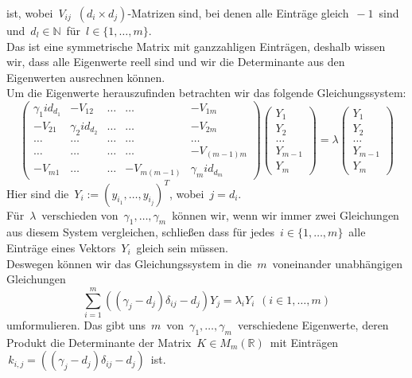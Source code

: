 ist, wobei $\,V_{ij}\,$ $(d_i\times d_j)$-Matrizen sind, bei denen alle Einträge gleich $\,-1\,$ sind und $\,d_l\in\mathbb{N}\,$ für $\,l\in \{1,\ldots,m\}$.\;\\
Das ist eine symmetrische Matrix mit ganzzahligen Einträgen, deshalb wissen wir, dass alle Eigenwerte reell sind und wir die Determinante aus den Eigenwerten ausrechnen können.\\
Um die Eigenwerte herauszufinden betrachten wir das folgende Gleichungssystem:
\begin{equation}
\begin{pmatrix}
 {\gamma_1}id_{d_1}&-V_{12}&\ldots&\ldots&-V_{1m}\\
 -V_{21}&{\gamma_2}id_{d_2}&\ldots&\ldots&-V_{2m}\\
 \ldots&\ldots&\ldots&\ldots&\ldots\\
  \ldots&\ldots&\ldots&\ldots&-V_{(m-1)m}\\
 -V_{m1}&\ldots&\ldots&-V_{m(m-1)}&{\gamma_m}id_{d_m}
\end{pmatrix}
\begin{pmatrix}
 Y_1\\
 Y_2\\
 \ldots\\
 Y_{m-1}\\
 Y_m
\end{pmatrix}
 =\lambda
 \begin{pmatrix}
 Y_1\\
 Y_2\\
 \ldots\\
 Y_{m-1}\\
 Y_m
\end{pmatrix}
\end{equation}
Hier sind die $\,Y_i:=(y_{i_1},\ldots,y_{i_j})^T$,\; wobei $\,j=d_i$.\; \\
Für $\,\lambda\,$ verschieden von $\,\gamma_1,\ldots,\gamma_m\,$ können wir, wenn wir immer zwei Gleichungen aus diesem System vergleichen, schließen dass für jedes $\,i \in \{1,\ldots,m\}\,$ alle Einträge eines Vektors $\,Y_i\,$ gleich sein müssen.\\
Deswegen können wir das Gleichungssystem in die $\,m\,$ voneinander unabhängigen Gleichungen 
\begin{equation}
 \sum_{i=1}^m((\gamma_j-d_j)\delta_{ij}-d_j)Y_j=\lambda_iY_i
  \hspace{5pt}(i\in{1,\ldots,m})
\end{equation}
umformulieren.
Das gibt uns $\,m\,$  von $\,\gamma_1,\ldots,\gamma_m\,$ verschiedene Eigenwerte, deren Produkt die Determinante der Matrix $\,K \in M_m(\mathbb{R})\,$ mit Einträgen $\,k_{i,j}=((\gamma_j-d_j)\delta_{ij}-d_j)\,$ ist.\\
